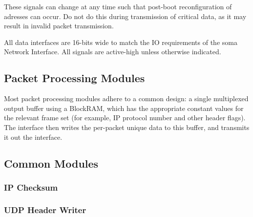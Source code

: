 These signals can change at any time such that post-boot
reconfiguration of adresses can occur. Do not do this during
transmission of critical data, as it may result in invalid packet
transmission.

All data interfaces are 16-bits wide to match the IO requirements of
the soma Network Interface. All signals are active-high unless
otherwise indicated.


\subsection{Packet Processing Modules}
Most packet processing modules adhere to a common design: a single
multiplexed output buffer using a BlockRAM, which has the appropriate
constant values for the relevant frame set (for example, IP protocol
number and other header flags). The interface then writes the
per-packet unique data to this buffer, and transmits it out the
interface.


\subsection{Common Modules}
\subsubsection{IP Checksum}
\subsubsection{UDP Header Writer} 

